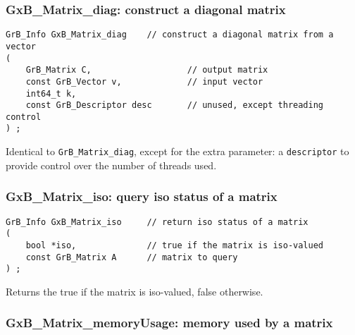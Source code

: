 \documentclass[12pt]{article}
\begin{document}
{\newpage
\subsubsection{{\sf GxB\_Matrix\_diag:} construct a diagonal matrix}
\label{matrix_diag_GxB}

\begin{mdframed}[userdefinedwidth=6in]
{\footnotesize
\begin{verbatim}
GrB_Info GxB_Matrix_diag    // construct a diagonal matrix from a vector
(
    GrB_Matrix C,                   // output matrix
    const GrB_Vector v,             // input vector
    int64_t k,
    const GrB_Descriptor desc       // unused, except threading control
) ;
\end{verbatim} } \end{mdframed}

Identical to \verb'GrB_Matrix_diag', except for the extra parameter:
a \verb'descriptor' to provide control over the number of threads used.

\subsubsection{{\sf GxB\_Matrix\_iso:} query iso status of a matrix}
\label{matrix_iso}

\begin{mdframed}[userdefinedwidth=6in]
{\footnotesize
\begin{verbatim}
GrB_Info GxB_Matrix_iso     // return iso status of a matrix
(
    bool *iso,              // true if the matrix is iso-valued
    const GrB_Matrix A      // matrix to query
) ;
\end{verbatim} } \end{mdframed}

Returns the true if the matrix is iso-valued, false otherwise.

\subsubsection{{\sf GxB\_Matrix\_memoryUsage:} memory used by a matrix}
\label{matrix_memusage}

}
\end{document}
